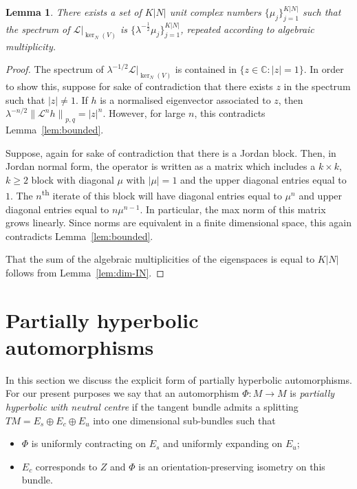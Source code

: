 \documentclass[a4paper,11pt]{amsart}
\newtheorem{lemma}[theorem]{Lemma}
\theoremstyle{remark}
\newcommand{\abs}[1]{\left|#1\right|} %
\newcommand{\bC}{\mathbb{C}} %
\newcommand{\cL}{\mathcal{L}} %
\newcommand{\dv}{V} %
\newcommand{\dz}{Z} %
\begin{document}
\begin{lemma}
    \label{lem:outer-spec}
    There exists a set of \(K\abs{N}\) unit complex numbers \(\{\mu_j\}_{j=1}^{K\abs{N}}\) such that the spectrum of \({\left.\cL\right|}_{\ker_N(\dv)}\) is 
    \(\{\lambda^{-\frac{1}{2}}\mu_{j}\}_{j=1}^{K\abs{N}}\), repeated according to algebraic multiplicity.
\end{lemma}

\begin{proof}
    The spectrum of \(\lambda^{-1/2} {\left.\cL\right|}_{\ker_N(\dv)}\) is contained in 
    \(\{z\in \bC:\abs{z} = 1\}\).
    In order to show this, suppose for sake of contradiction that there exists \(z\) in the spectrum such that \(\abs{z} \neq 1\).
    If \(h\) is a normalised eigenvector associated to \(z\), then \(\lambda^{-n/2}{\|\cL^n h\|}_{p,q} = \abs{z}^n\). However, for large \(n\), this contradicts Lemma~\ref{lem:bounded}.
    
    Suppose, again for sake of contradiction that there is a Jordan block. 
    Then, in Jordan normal form, the operator is written as a matrix which includes a \(k \times k\), \(k \geq 2\) block with diagonal \(\mu\) with \(\abs{\mu}=1\) and the upper diagonal entries equal to \(1\).
    The \(n\)\textsuperscript{th} iterate of this block will have diagonal entries equal to \(\mu^n\) and upper diagonal entries equal to \(n\mu^{n-1}\).
    In particular, the max norm of this matrix grows linearly. 
    Since norms are equivalent in a finite dimensional space, this again  contradicts Lemma~\ref{lem:bounded}. 

    That the sum of the algebraic multiplicities of the eigenspaces is equal to \(K\abs{N}\) follows from Lemma~\ref{lem:dim-IN}.
\end{proof}

\appendix
\section{Partially hyperbolic automorphisms}
\label{sec:examples}

In this section we discuss the explicit form of partially hyperbolic automorphisms.
For our present purposes we say that an automorphism \(\Phi : M \to M\) is \emph{partially hyperbolic with neutral centre} if the tangent bundle admits a splitting \(TM = E_s \oplus E_c \oplus E_u\) into one dimensional sub-bundles such that
\begin{itemize}
    \item \(\Phi\) is uniformly contracting on \(E_s\) and uniformly expanding on \(E_u\);
    \item \(E_c\) corresponds to \(\dz\) and \(\Phi\) is an orientation-preserving isometry on this bundle.
\end{itemize}
\end{document}
